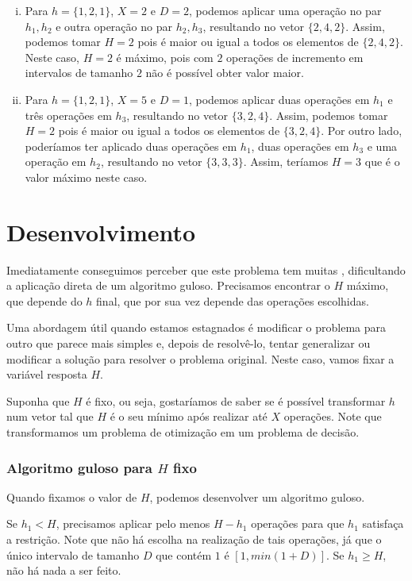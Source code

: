 \begin{enumerate}[i)]
    \item Para $h = \{1, 2, 1\}$, $X = 2$ e $D = 2$, podemos aplicar uma operação no par $h_1, h_2$ e outra operação no par $h_2, h_3$, resultando no vetor $\{2, 4, 2\}$. Assim, podemos tomar $H = 2$ pois é maior ou igual a todos os elementos de $\{2, 4, 2\}$. Neste caso, $H = 2$ é máximo, pois com $2$ operações de incremento em intervalos de tamanho $2$ não é possível obter valor maior.
    \item Para $h = \{1, 2, 1\}$, $X = 5$ e $D = 1$, podemos aplicar duas operações em $h_1$ e três operações em $h_3$, resultando no vetor $\{3, 2, 4\}$. Assim, podemos tomar $H = 2$ pois é maior ou igual a todos os elementos de $\{3, 2, 4\}$. Por outro lado, poderíamos ter aplicado duas operações em $h_1$, duas operações em $h_3$ e uma operação em $h_2$, resultando no vetor $\{3, 3, 3\}$. Assim, teríamos $H = 3$ que é o valor máximo neste caso.
\end{enumerate}

\section{Desenvolvimento}

Imediatamente conseguimos perceber que este problema tem muitas , dificultando a aplicação direta de um algoritmo guloso. Precisamos encontrar o $H$ máximo, que depende do $h$ final, que por sua vez depende das operações escolhidas.

Uma abordagem útil quando estamos estagnados é modificar o problema para outro que parece mais simples e, depois de resolvê-lo, tentar generalizar ou modificar a solução para resolver o problema original. Neste caso, vamos fixar a variável resposta $H$.

Suponha que $H$ é fixo, ou seja, gostaríamos de saber se é possível transformar $h$ num vetor tal que $H$ é o seu mínimo após realizar até $X$ operações. Note que transformamos um problema de otimização em um problema de decisão.

\subsubsection*{Algoritmo guloso para $H$ fixo}

Quando fixamos o valor de $H$, podemos desenvolver um algoritmo guloso.

Se $h_1 < H$, precisamos aplicar pelo menos $H - h_1$ operações para que $h_1$ satisfaça a restrição. Note que não há escolha na realização de tais operações, já que o único intervalo de tamanho $D$ que contém $1$ é $[1, min(1 + D)]$. Se $h_1 \geq H$, não há nada a ser feito.

